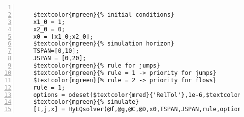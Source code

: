 %  
%  
%  
%  
  
  
\DefineShortVerb[fontfamily=courier,fontseries=m]{\$} 
\DefineShortVerb[fontfamily=courier,fontseries=b]{\#} 
  
\begin{Verbatim}[commandchars=\$\{\},numbers=left,numbersep=2pt] 

    $textcolor{mgreen}{% initial conditions} 
    x1_0 = 1; 
    x2_0 = 0; 
    x0 = [x1_0;x2_0]; 
    $textcolor{mgreen}{% simulation horizon} 
    TSPAN=[0,10]; 
    JSPAN = [0,20]; 
    $textcolor{mgreen}{% rule for jumps} 
    $textcolor{mgreen}{% rule = 1 -> priority for jumps} 
    $textcolor{mgreen}{% rule = 2 -> priority for flows} 
    rule = 1; 
    options = odeset($textcolor{mred}{'RelTol'},1e-6,$textcolor{mred}{'MaxStep'},.1); 
    $textcolor{mgreen}{% simulate} 
    [t,j,x] = HyEQsolver(@f,@g,@C,@D,x0,TSPAN,JSPAN,rule,options);  
\end{Verbatim}  
  
\UndefineShortVerb{\$} 
\UndefineShortVerb{\#} 
 